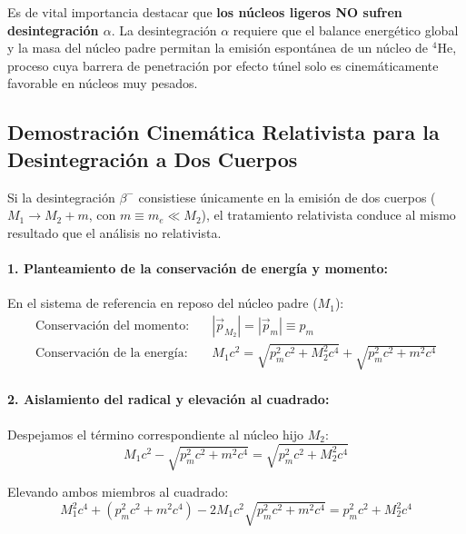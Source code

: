 \begin{observacion}
Es de vital importancia destacar que \textbf{los núcleos ligeros NO sufren desintegración $\alpha$}. La desintegración $\alpha$ requiere que el balance energético global y la masa del núcleo padre permitan la emisión espontánea de un núcleo de $^4\text{He}$, proceso cuya barrera de penetración por efecto túnel solo es cinemáticamente favorable en núcleos muy pesados.
\end{observacion}

\newpage
\subsection{Demostración Cinemática Relativista para la Desintegración a Dos Cuerpos}

Si la desintegración $\beta^-$ consistiese únicamente en la emisión de dos cuerpos ($M_1 \to M_2 + m$, con $m \equiv m_e \ll M_2$), el tratamiento relativista conduce al mismo resultado que el análisis no relativista.

\paragraph{1. Planteamiento de la conservación de energía y momento:}
En el sistema de referencia en reposo del núcleo padre ($M_1$):
\begin{align}
\text{Conservación del momento:} \quad & |\vec{p}_{M_2}| = |\vec{p}_m| \equiv p_m \\
\text{Conservación de la energía:} \quad & M_1 c^2 = \sqrt{p_m^2 c^2 + M_2^2 c^4} + \sqrt{p_m^2 c^2 + m^2 c^4}
\end{align}

\paragraph{2. Aislamiento del radical y elevación al cuadrado:}
Despejamos el término correspondiente al núcleo hijo $M_2$:
\begin{equation}
M_1 c^2 - \sqrt{p_m^2 c^2 + m^2 c^4} = \sqrt{p_m^2 c^2 + M_2^2 c^4}
\end{equation}

Elevando ambos miembros al cuadrado:
\begin{equation}
M_1^2 c^4 + (p_m^2 c^2 + m^2 c^4) - 2 M_1 c^2 \sqrt{p_m^2 c^2 + m^2 c^4} = p_m^2 c^2 + M_2^2 c^4
\end{equation}

